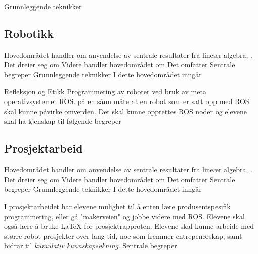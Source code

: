     Grunnleggende teknikker


\subsection*{Robotikk}

    Hovedområdet handler om anvendelse av sentrale resultater fra lineær algebra, .
    Det dreier seg om
    Videre handler hovedområdet om
    Det omfatter
    Sentrale begreper
    Grunnleggende teknikker
    I dette hovedområdet inngår

    Refleksjon og Etikk
    Programmering av roboter ved bruk av meta operativsystemet ROS.
     på en sånn måte at en robot som er satt opp med ROS skal kunne påvirke omverden. Det skal kunne opprettes ROS noder og elevene skal ha kjenskap til følgende begreper


\subsection*{Prosjektarbeid}

    Hovedområdet handler om anvendelse av sentrale resultater fra lineær algebra, .
    Det dreier seg om
    Videre handler hovedområdet om
    Det omfatter
    Sentrale begreper
    Grunnleggende teknikker
    I dette hovedområdet inngår

    I prosjektarbeidet har elevene mulighet til å enten lære produsentspesifik programmering, eller gå "makerveien" og jobbe videre med ROS. Elevene skal også lære å bruke LaTeX for prosjektrapproten. Elevene skal kunne arbeide med større robot prosjekter over lang tid, noe som fremmer entrepenørskap, samt bidrar til \emph{kumulativ kunnskapsøkning}.
     Sentrale begreper
